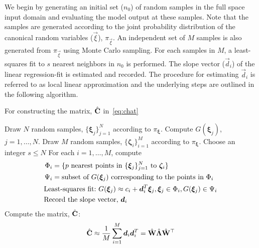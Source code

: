 We begin by generating an initial set ($n_0$) of random samples in the full space input domain
and evaluating the model output at these samples. Note that the samples are generated
according to the joint probability distribution of the canonical random variables
($\vec\xi$), $\pi_\vec\xi$. An independent set of $M$ samples is also generated from $\pi_\vec\xi$
using Monte Carlo sampling. For each samples in $M$, a least-squares fit to $s$ nearest neighbors in
$n_0$ is performed. The slope vector ($\vec{d}_i$) of the linear regression-fit is estimated and recorded.
The procedure for estimating $\vec{d}_i$ is referred to as local linear approximation and the underlying steps
are outlined in the following algorithm. 
%
\bigskip
\begin{breakablealgorithm}
\renewcommand{\algorithmicrequire}{\textbf{Input:}}
\renewcommand{\algorithmicensure}{\textbf{Output:}}
  \caption{For constructing the matrix, $\hat{\mathbf{{C}}}$ in~\eqref{eq:chat}}
  \begin{algorithmic}[1]
	\State Draw $N$ random samples, $\{\bm{\xi}_j\}_{j=1}^{N}$ 
	according to $\pi_{\bm{\xi}}$.
	\State Compute $G(\bm\xi_j)$, $j=1, \ldots, N$.
	\State Draw $M$ random samples, $\{\bm{\zeta}_i\}_{i=1}^{M}$
	according to $\pi_{\bm{\xi}}$.
	\State Choose an integer $s \leq N$ 
	\State For each $i=1, \ldots, M$, compute 
	\[
	\begin{aligned}
	\Phi_i &= \{ p \text{ nearest points in } \{\bm{\xi}_j\}_{j=1}^{N} \text{ to } \bm{\zeta}_i\}\\
	\vspace{-2mm}
	\Psi_i &= \text{subset of } G(\bm\xi_j) \text{ corresponding to the points in } \Phi_i\\
	\vspace{-2mm}
	 &{\color{white}=} \hspace{-7mm} \text{Least-squares fit:~} 
	 G(\bm\xi_j) \approx c_i + \vec{d}_i^T\bm{\xi}_j,  \bm{\xi}_j \in \Phi_i, G(\bm\xi_j) \in \Psi_i\\
	 \vspace{-2mm}
	  &{\color{white}=} \hspace{-7mm}\text{Record the slope vector,}~\vec{d}_i
	\end{aligned}
	\]
	\State Compute the matrix, $\hat{\mathbf{{C}}}$:
	\[
	\hat{\mat{C}} \approx \frac{1}{M} \sum_{i=1}^{M} \vec{d}_i\vec{d}_i^T = \hat{\mat{W}}\hat{\mat{\Lambda}}\hat{\mat{W}}^\top
	\]
	\EndProcedure
  \end{algorithmic}
  \label{alg:lla}
\end{breakablealgorithm}
\bigskip

